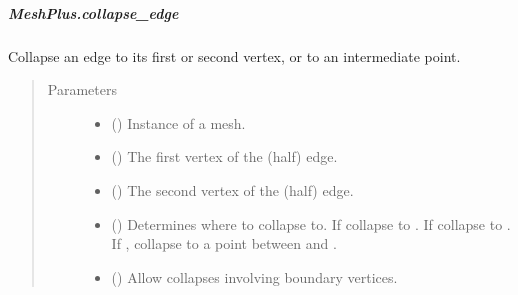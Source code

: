 \documentclass[letterpaper,10pt,english]{sphinxmanual}
\begin{document}
\begin{fulllineitems}
\begin{fulllineitems}
\end{fulllineitems}



\subparagraph{MeshPlus.collapse\_edge}
\label{\detokenize{api/generated/directional_clustering.mesh.MeshPlus.collapse_edge:meshplus-collapse-edge}}\label{\detokenize{api/generated/directional_clustering.mesh.MeshPlus.collapse_edge::doc}}

\begin{fulllineitems}
\label{\detokenize{api/generated/directional_clustering.mesh.MeshPlus.collapse_edge:directional_clustering.mesh.MeshPlus.collapse_edge}}
Collapse an edge to its first or second vertex, or to an intermediate point.
\begin{quote}\begin{description}
\item[{Parameters}] \leavevmode\begin{itemize}
\item {} 
 () \textendash{} Instance of a mesh.

\item {} 
 () \textendash{} The first vertex of the (half\sphinxhyphen{}) edge.

\item {} 
 () \textendash{} The second vertex of the (half\sphinxhyphen{}) edge.

\item {} 
 () \textendash{} Determines where to collapse to.
If  collapse to .
If  collapse to .
If , collapse to a point between  and .

\item {} 
 () \textendash{} Allow collapses involving boundary vertices.


\end{itemize}
\end{description}
\end{quote}
\end{fulllineitems}
\end{fulllineitems}
\end{document}
